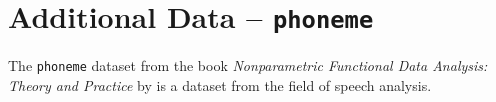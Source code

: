 \section{Additional Data -- \texttt{phoneme}}

The \texttt{phoneme} dataset from the book \emph{Nonparametric Functional Data Analysis: Theory and Practice} by \textcite{ferraty_functional_2006} is a dataset from the field of speech  analysis.